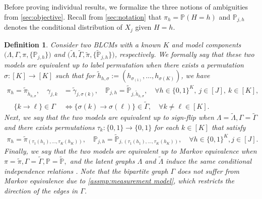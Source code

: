 \documentclass[10pt]{article} %
\newtheorem{definition}{Definition}
\newcommand{\PP}{\mathbb P}
\def\tilde{\widetilde}
\begin{document}
Before proving individual results, we formalize the three notions of ambiguities from \cref{sec:objective}. Recall from \cref{sec:notation} that $\pi_h = \PP(H =h)$ and $\PP_{j,h}$ denotes the conditional distribution of $X_j$ given $H=h$.
\begin{definition}\label{def:ambiguities}
    Consider two BLCMs with a known $K$ and model components $\big(\Lambda, \Gamma, \pi, \{\PP_{j,h}\}\big)$ and $\big(\tilde{\Lambda}, \tilde{\Gamma}, \tilde{\pi}, \{\tilde{\PP}_{j,h}\} \big)$, respectively. We formally say that these two models are equivalent up to \emph{label permutation} when there exists a permutation $\sigma:[K] \to [K]$ such that for $\tilde{h}_{h,\sigma} := (h_{\sigma_{(1)}}, \ldots, {h_{\sigma(K)}})$, we have
    \begin{align*}
        \pi_h  = \tilde{\pi}_{\tilde{h}_{h,\sigma}}, \quad \gamma_{j,k} &= \tilde{\gamma}_{j,\sigma(k)}, \quad \PP_{j,h} = \tilde{\PP}_{j,\tilde{h}_{h,\sigma}}, \quad \forall h \in \{0,1\}^K, ~ j \in [J], ~ k \in [K], \\
        \quad 
        \{k \to \ell\} \in \Gamma &\iff \{\sigma(k) \to \sigma(\ell)\} \in \tilde{\Gamma}, \quad \forall k \neq \ell \in [K].
    \end{align*}
    Next, we say that the two models are equivalent up to \emph{sign-flip} when $\Lambda = \tilde{\Lambda}, \Gamma = \tilde{\Gamma}$ and there exists permutations $\tau_k:\{0,1\} \to \{0,1\}$ for each $k \in [K]$ that satisfy
    \begin{align*}
        \pi_h = \tilde{\pi}_{(\tau_1(h_1), \ldots, \tau_K(h_K))}, \quad \PP_{j,h} = \tilde{\PP}_{j,(\tau_1(h_1), \ldots, \tau_K(h_K))}, \quad \forall h \in \{0,1\}^K, j \in [J].
    \end{align*}
    Finally, we say that the two models are equivalent up to \emph{Markov equivalence} when $\pi = \tilde{\pi}, \Gamma = \tilde{\Gamma}, \PP =\tilde{\PP},$ and the latent graphs $\Lambda$ and $\tilde{\Lambda}$ induce the same conditional independence relations \citep{pearl2014probabilistic}. Note that the bipartite graph $\Gamma$ does not suffer from Markov equivalence due to \cref{assmp:measurement model}, which restricts the direction of the edges in $\Gamma$.
\end{definition}


%
%
%
%
\end{document}
